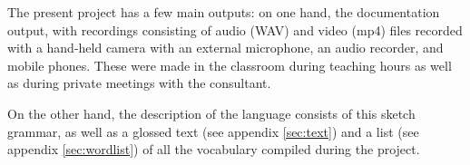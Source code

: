 \documentclass[../hewa_main-subfiles.tex]{subfiles}
\begin{document}
The present project has a few main outputs: on one hand, the documentation output, with recordings consisting of audio (WAV) and video (mp4) files recorded with a hand-held camera with an external microphone, an audio recorder, and mobile phones. These were made in the classroom during teaching hours as well as during private meetings with the consultant.

On the other hand, the description of the language consists of this sketch grammar, as well as a glossed text (see appendix \ref{sec:text})  and a list (see appendix \ref{sec:wordlist}) of all the vocabulary compiled during the project.
\end{document}

